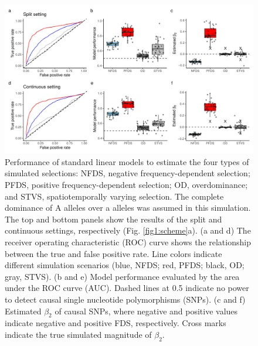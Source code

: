 \documentclass[12pt,]{article}
\begin{document}
\begin{figure}[ht]
  \includegraphics[width=0.85\linewidth]{beta2LMdomi.pdf}
  \caption{Performance of standard linear models to estimate the four types of simulated selections: NFDS, negative frequency-dependent selection; PFDS, positive frequency-dependent selection; OD, overdominance; and STVS, spatiotemporally varying selection. The complete dominance of A alleles over a alleles was assumed in this simulation. The top and bottom panels show the results of the split and continuous settings, respectively (Fig. \ref{fig1:scheme}a). (a and d) The receiver operating characteristic (ROC) curve shows the relationship between the true and false positive rate. Line colors indicate different simulation scenarios (blue, NFDS; red, PFDS; black, OD; gray, STVS). (b and e) Model performance evaluated by the area under the ROC curve (AUC). Dashed lines at 0.5 indicate no power to detect causal single nucleotide polymorphisms (SNPs). (c and f) Estimated $\beta_2$ of causal SNPs, where negative and positive values indicate negative and positive FDS, respectively. Cross marks indicate the true simulated magnitude of $\beta_2$.}
  \label{figS5:beta2LM}
\end{figure}
\end{document}
